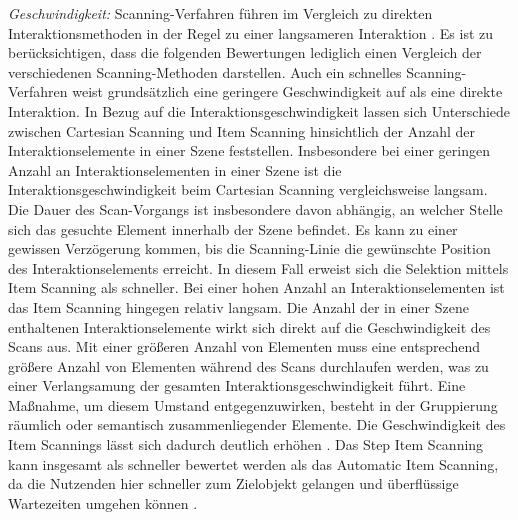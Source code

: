 \textit{Geschwindigkeit:}
Scanning-Verfahren führen im Vergleich zu direkten Interaktionsmethoden in der Regel zu einer langsameren Interaktion \citep{COOK2015117}. Es ist zu berücksichtigen, dass die folgenden Bewertungen lediglich einen Vergleich der verschiedenen Scanning-Methoden darstellen. Auch ein schnelles Scanning-Verfahren weist grundsätzlich eine geringere Geschwindigkeit auf als eine direkte Interaktion.
In Bezug auf die Interaktionsgeschwindigkeit lassen sich Unterschiede zwischen Cartesian Scanning und Item Scanning hinsichtlich der Anzahl der Interaktionselemente in einer Szene feststellen. Insbesondere bei einer geringen Anzahl an Interaktionselementen in einer Szene ist die Interaktionsgeschwindigkeit beim Cartesian Scanning vergleichsweise langsam. Die Dauer des Scan-Vorgangs ist insbesondere davon abhängig, an welcher Stelle sich das gesuchte Element innerhalb der Szene befindet. Es kann zu einer gewissen Verzögerung kommen, bis die Scanning-Linie die gewünschte Position des Interaktionselements erreicht. In diesem Fall erweist sich die Selektion mittels Item Scanning als schneller. Bei einer hohen Anzahl an Interaktionselementen ist das Item Scanning hingegen relativ langsam.  Die Anzahl der in einer Szene enthaltenen Interaktionselemente wirkt sich direkt auf die Geschwindigkeit des Scans aus. Mit einer größeren Anzahl von Elementen muss eine entsprechend größere Anzahl von Elementen während des Scans durchlaufen werden, was zu einer Verlangsamung der gesamten Interaktionsgeschwindigkeit führt. Eine Maßnahme, um diesem Umstand entgegenzuwirken, besteht in der Gruppierung räumlich oder semantisch zusammenliegender Elemente. Die Geschwindigkeit des Item Scannings lässt sich dadurch deutlich erhöhen \citep{COOK2015117}. Das Step Item Scanning kann insgesamt als schneller bewertet werden als das Automatic Item Scanning, da die Nutzenden hier schneller zum Zielobjekt gelangen und überflüssige Wartezeiten umgehen können \citep{COOK2015117}.  

